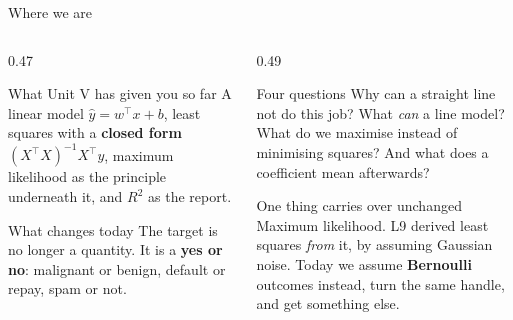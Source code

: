 \documentclass[aspectratio=169]{beamer}
\begin{document}
\begin{frame}[shrink=5]{Where we are}
  \begin{columns}[T]
    \begin{column}{0.47\textwidth}
      \begin{block}{What Unit V has given you so far}
        A linear model $\hat y = w^{\!\top}x + b$, least squares with a
        \textbf{closed form} $(X^{\!\top}X)^{-1}X^{\!\top}y$, maximum
        likelihood as the principle underneath it, and $R^2$ as the report.
      \end{block}
      \begin{block}{What changes today}
        The target is no longer a quantity. It is a \textbf{yes or no}:
        malignant or benign, default or repay, spam or not.
      \end{block}
    \end{column}
    \begin{column}{0.49\textwidth}
      \begin{exampleblock}{Four questions}
        Why can a straight line not do this job? What \emph{can} a line
        model? What do we maximise instead of minimising squares? And what
        does a coefficient mean afterwards?
      \end{exampleblock}
      \begin{alertblock}{One thing carries over unchanged}
        \small Maximum likelihood. L9 derived least squares \emph{from} it,
        by assuming Gaussian noise. Today we assume \textbf{Bernoulli}
        outcomes instead, turn the same handle, and get something else.
      \end{alertblock}
    \end{column}
  \end{columns}
\end{frame}
\end{document}
